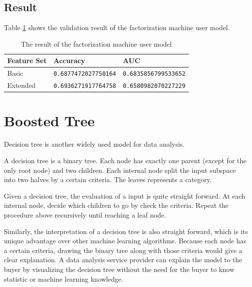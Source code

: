     \subsection{Result}

        Table \ref{table:fm result} shows the validation result of the factorization machine user model.

        \begin{table}[hpbt]
        \centering
        \begin{tabular}{lll}
            \hline
            Feature Set & Accuracy & AUC \\
            \hline
            Basic    & \verb|0.6877472027750164| & \verb|0.6835856799533652| \\
            Extended & \verb|0.6936271917764758| & \verb|0.6580982070227229| \\
            \hline
        \end{tabular}
        \caption{The result of the factorization machine user model}
        \label{table:fm result}
        \end{table}

\section{Boosted Tree}

        Decision tree is another widely used model for data analysis.

        A decision tree is a binary tree.
        Each node has exactly one parent (except for the only root node) and two children.
        Each internal node split the input subspace into two halves by a certain criteria.
        The leaves represents a category.

        Given a decision tree, the evaluation of a input is quite straight forward.
        At each internal node, decide which children to go by check the criteria.
        Repeat the procedure above recursively until reaching a leaf node.

        Similarly, the interpretation of a decision tree is also straight forward,
        which is its unique advantage over other machine learning algorithms.
        Because each node has a certain criteria,
        drawing the binary tree along with those criteria would give a clear explanation.
        A data analysis service provider can explain the model to the buyer by visualizing
        the decision tree without the need for the buyer to know statistic or machine learning knowledge.

